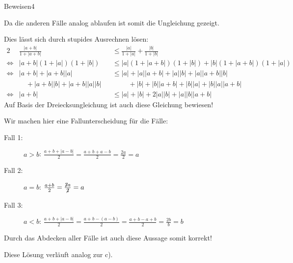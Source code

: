 \begin{aufgabe}{Beweisen}{4}
\begin{aufgaben}
\begin{description}
        \end{description}
        Da die anderen Fälle analog ablaufen ist somit die Ungleichung gezeigt. \hfill \qedsymbol
        \item Dies lässt sich durch stupides Ausrechnen lösen: \begin{alignat*}{2}
            & \frac{|a + b |}{1 + |a+b|} && \leq \frac{|a|}{1 + |a|} + \frac{|b|}{1 + |b|} \\
            \Leftrightarrow& |a+b|(1+|a|)(1+|b|) &&\leq |a|(1+|a+b|)(1+|b|) + |b|(1+|a+b|)(1+|a|) \\
            \Leftrightarrow& |a+b| + |a+b||a| &&  \leq |a| + |a| |a+b| + |a||b| + |a||a+b||b|  \\
            & \quad + |a+b||b| + |a+b||a||b| && \phantom{{}\leq{}}\quad + |b| + |b| |a+b| + |b||a| + |b| |a| |a+b| \\
            \Leftrightarrow& |a+b| &&\leq |a| +|b| + 2|a||b| + |a||b||a+b|
        \end{alignat*}
        Auf Basis der Dreiecksungleichung ist auch diese Gleichung bewiesen!\hfill \qedsymbol
        \item Wir machen hier eine Fallunterscheidung für die Fälle: \begin{description}
            \item[Fall 1: ] $a > b$: $\frac{a+b+|a-b|}{2} = \frac{a+b+a-b}{2} = \frac{2a}{2} = a$
            \item[Fall 2: ] $a = b$: $\frac{a+b}{2} = \frac{\centernot{2}a}{\centernot{2}} = a$
            \item[Fall 3: ] $a < b$: $\frac{a+b + |a-b|}{2} = \frac{a+b - (a-b)}{2} = \frac{a+b - a +b}{2} = \frac{2b}{b} = b$
        \end{description}
        Durch das Abdecken aller Fälle ist auch diese Aussage somit korrekt! \hfill \qedsymbol
        \item Diese Lösung verläuft analog zur c).
    \end{aufgaben}
\end{aufgabe}

